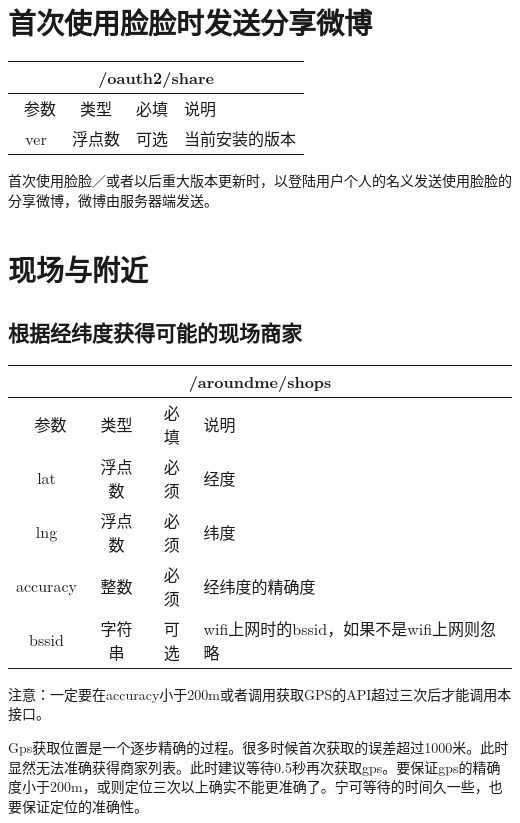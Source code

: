 \documentclass[cs4size]{ctexartutf8}
\begin{document}
\section{首次使用脸脸时发送分享微博}

\begin{table}[H]
   \begin{center}
\begin{tabular}{|c|c|c|p{12cm}|}
\hline
\multicolumn{4}{|c|}{/oauth2/share} \\
\hline\hline
 \  参数  & 类型 & 必填 &  说明  \\
\hline
   ver  & 浮点数 & 可选 &  当前安装的版本\\
\hline
\end{tabular}
   \end{center}
\end{table}

首次使用脸脸／或者以后重大版本更新时，以登陆用户个人的名义发送使用脸脸的分享微博，微博由服务器端发送。


\section{现场与附近}

\subsection{根据经纬度获得可能的现场商家}

\begin{table}[H]
   \begin{center}
\begin{tabular}{|c|c|c|p{12cm}|}
\hline
\multicolumn{4}{|c|}{/aroundme/shops} \\
\hline\hline
 \  参数  & 类型 & 必填 &  说明  \\
\hline
 lat  & 浮点数 & 必须 & 经度\\
\hline
 lng  &  浮点数 & 必须 & 纬度\\ 
\hline
 accuracy  & 整数 & 必须 & 经纬度的精确度\\ 
\hline
 bssid  & 字符串 & 可选 & wifi上网时的bssid，如果不是wifi上网则忽略\\  
\hline
\end{tabular}
   \end{center}
\end{table}

注意：一定要在accuracy小于200m或者调用获取GPS的API超过三次后才能调用本接口。

Gps获取位置是一个逐步精确的过程。很多时候首次获取的误差超过1000米。此时显然无法准确获得商家列表。此时建议等待0.5秒再次获取gps。要保证gps的精确度小于200m，或则定位三次以上确实不能更准确了。宁可等待的时间久一些，也要保证定位的准确性。
\end{document}

